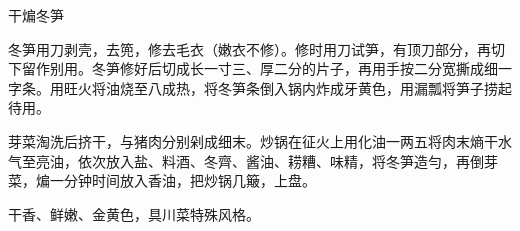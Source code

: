 \begin{recipe}{干煸冬笋}

\ingredients


\cooking

\step 冬笋用刀剥壳，去篼，修去毛衣（嫩衣不修）。修时用刀试笋，有顶刀部分，再切下留作别用。冬笋修好后切成长一寸三、厚二分的片子，再用手按二分宽撕成细一字条。用旺火将油烧至八成热，将冬笋条倒入锅内炸成牙黄色，用漏瓢将笋子捞起待用。

\step 芽菜淘洗后挤干，与猪肉分别剁成细末。炒锅在征火上用化油一两五将肉末熵干水气至亮油，依次放入盐、料酒、冬齊、酱油、耢糟、味精，将冬笋造勻，再倒芽菜，煸一分钟时间放入香油，把炒锅几簸，上盘。

\notes

干香、鲜嫩、金黄色，具川菜特殊风格。

\end{recipe}

